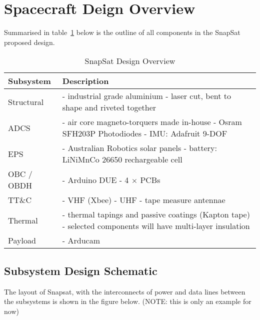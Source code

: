 \section{Spacecraft Deign Overview}
Summarised in table~\ref{tab:designoverview} below is the outline of all components in the SnapSat proposed design.

\begin{table}[H]
    \centering
    \caption{SnapSat Design Overview}
    \vspace{0.15cm}
    \label{tab:designoverview}
    {\renewcommand{\arraystretch}{1.4}%
        \begin{tabular}{|>{\arraybackslash}m{3cm}|>{\arraybackslash}m{10cm}|}
            \hline
            \textbf{Subsystem} & \textbf{Description} \\ \hline\hline
            Structural & - industrial grade aluminium \newline - laser cut, bent to shape and riveted together \\\hline
            ADCS & - air core magneto-torquers made in-house \newline - Osram SFH203P Photodiodes \newline - IMU: Adafruit 9-DOF  \\\hline
            EPS & - Australian Robotics solar panels \newline - battery: LiNiMnCo 26650 rechargeable cell  \\\hline
            OBC / OBDH & - Arduino DUE \newline - 4 $\times$ PCBs  \\\hline
           TT\&C & - VHF (Xbee) \newline - UHF \newline - tape measure antennae \\\hline
           Thermal & - thermal tapings and passive coatings (Kapton tape) \newline - selected components will have multi-layer insulation \\\hline
           Payload & - Arducam \\\hline
        \end{tabular} } 
    \end{table}
    
\subsection{Subsystem Design Schematic}
The layout of Snapsat, with the interconnects of power and data lines between the subsystems is shown in the figure below. (NOTE: this is only an example for now)

\begin{figure}[H]
\end{figure}
